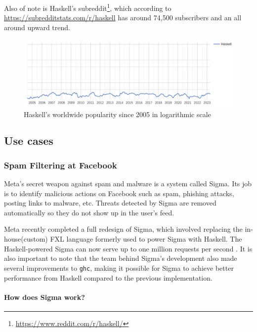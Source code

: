 \documentclass[a4paper, titlepage, twoside]{article}
\begin{document}
Also of note is Haskell's subreddit\footnote{\url{https://www.reddit.com/r/haskell/}}, which according to \url{https://subredditstats.com/r/haskell} has around 74,500 subscribers and an all around upward trend.

\begin{figure}[htbp]
\centering
\includegraphics[width=.9\linewidth]{img/2023-05-18_17-15-08_screenshot.png}
\caption{\label{fig:orge2cc86c}Haskell's worldwide popularity since 2005 in logarithmic scale \autocite{carbonnellePYPLPopularitYProgramming2023}}
\end{figure}

\subsection{Use cases}
\label{sec:orgc1ec515}

\subsubsection{Spam Filtering at Facebook}
\label{sec:org10d85fc}

Meta's secret weapon against spam and malware is a system called Sigma. Its job is to identify malicious actions on Facebook such as spam, phishing attacks, posting links to malware, etc. Threats detected by Sigma are removed automatically so they do not show up in the user's feed.

Meta recently completed a full redesign of Sigma, which involved replacing the in-house(custom) FXL language formerly used to power Sigma with Haskell. The Haskell-powered Sigma can now serve up to one million requests per second \autocite{marlowFightingSpamHaskell2015}. It is also important to note that the team behind Sigma's development also made several improvements to \texttt{ghc}, making it possible for Sigma to achieve better performance from Haskell compared to the previous implementation.

\paragraph*{How does Sigma work?}
\label{sec:org5bcb0e2}
\end{document}
